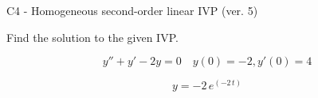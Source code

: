 \begin{exercise}
  \begin{exerciseTitle}C4 - Homogeneous second-order linear IVP (ver. 5)\end{exerciseTitle}
  \begin{exerciseStatement}
    
Find the solution to the given IVP.

    
\[y''+y'-2y = 0 \hspace{1em} y(0) = -2 , y'(0) = 4\]

  \end{exerciseStatement}
  \begin{exerciseAnswer}
    
\[y= -2 \, e^{\left(-2 \, t\right)}\]

  \end{exerciseAnswer}
\end{exercise}
